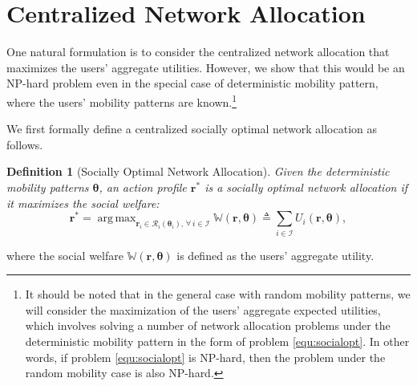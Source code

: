 \documentclass[journal]{IEEEtran}
\newcommand{\mc}[1]{\mathcal{#1}}
\newcommand{\bs}[1]{\boldsymbol{#1}}
\DeclareMathOperator*{\argmax}{arg\,max}
\newtheorem{definition}{Definition}
\begin{document}
\section{Centralized Network Allocation} \label{sec:centralized}

  One natural formulation is to consider the centralized network allocation that maximizes the users' aggregate utilities. 
	However, we show that this would be an NP-hard problem even in the special case of deterministic mobility pattern, where the users' mobility patterns are known.\footnote{It should be noted that in the general case with random mobility patterns, we will consider the maximization of the users' aggregate expected utilities, which involves solving a number of network allocation problems under the deterministic mobility pattern in the form of problem \eqref{equ:socialopt}. In other words, if problem \eqref{equ:socialopt} is NP-hard, then the problem under the random mobility case is also NP-hard.} %



  We first formally define a centralized socially optimal network allocation as follows.

\begin{definition}[Socially Optimal Network Allocation] %
  Given the deterministic mobility patterns $\boldsymbol{\theta}$, an action profile $\boldsymbol{r}^*$ is a socially optimal network allocation if it maximizes the social welfare: %
%
\begin{equation} \label{equ:socialopt}
	\boldsymbol{r}^* = \argmax_{\boldsymbol{r}_i \in \mc{R}_i(\bs{\theta}_i), \, \forall \, i \in \mathcal{I}} \mathbb{W}(\boldsymbol{r},\boldsymbol{\theta}) \triangleq \sum_{i \in \mc{I}} U_i(\boldsymbol{r},\boldsymbol{\theta}), %
\end{equation}
% 	
\end{definition}
where the social welfare $\mathbb{W}(\boldsymbol{r},\boldsymbol{\theta})$ is defined as the users' aggregate utility. 
\end{document}
